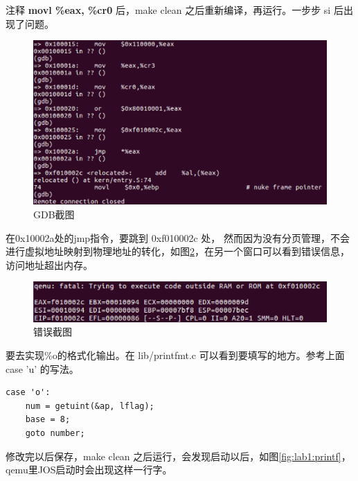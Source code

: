 \begin{ExerciseList}

注释 \textbf{movl \%eax, \%cr0} 后，make clean 之后重新编译，再运行。一步步 si 后出现了问题。

\begin{figure}[H]
  \centering
  \includegraphics[width=6in]{figures/lab1/ex7.png}
  \caption{GDB截图}\label{fig:lab1:ex7}
\end{figure}

在0x10002a处的jmp指令，要跳到 0xf010002c 处， 然而因为没有分页管理，不会进行虚拟地址映射到物理地址的转化，如图\ref{fig:lab1:fatal}，在另一个窗口可以看到错误信息，访问地址超出内存。

\begin{figure}[H]
  \centering
  \includegraphics[width=6in]{figures/lab1/fatal.png}
  \caption{错误截图}\label{fig:lab1:fatal}
\end{figure}


要去实现\%o的格式化输出。在 lib/printfmt.c 可以看到要填写的地方。参考上面 case 'u' 的写法。

\begin{verbatim}
case 'o':
    num = getuint(&ap, lflag);
    base = 8;
    goto number;
\end{verbatim}

修改完以后保存，make clean 之后运行，会发现启动以后，如图\ref{fig:lab1:printf}，qemu里JOS启动时会出现这样一行字。


\end{ExerciseList}
